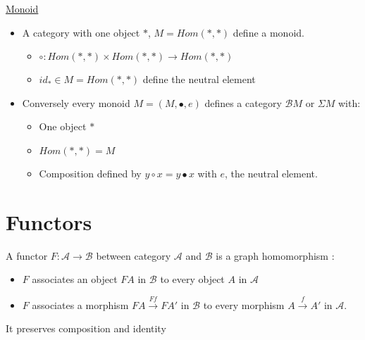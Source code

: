 \documentclass{article}
\theoremstyle{plain}
\begin{document}
    \ex \underline{Monoid}
    \begin{itemize}
      \item A category with one object $*$, $M = Hom(*, *)$ define a monoid.
        \begin{itemize}
          \item $\circ : Hom(*, *) \times Hom(*,*) \to Hom(*, *)$
          \item $id_* \in M = Hom(*, *)$ define the neutral element
        \end{itemize}
      \item Conversely every monoid $M = (M, \bullet, e)$ defines a category
        $\mathcal B M$ or $\Sigma M$ with:
        \begin{itemize}
          \item One object $*$
          \item $Hom(*, *) = M$
          \item Composition defined by $y \circ x = y \bullet x$ with $e$, the neutral
        element.

        \end{itemize}

      \begin{center}
      \end{center}
    \end{itemize}

  \section{Functors}

    A functor $F : \mathcal A \to \mathcal B$ between category $\mathcal A$ and
    $\mathcal B$ is a graph homomorphism :
    \begin{itemize}
      \item $F$ associates an object $FA$ in $\mathcal B$ to every object $A$
        in $\mathcal A$
      \item $F$ associates a morphism $FA \xrightarrow{Ff} F A'$ in $\mathcal
        B$ to every morphism $A \xrightarrow{f} A'$ in $\mathcal A$.
    \end{itemize}
    It preserves composition and identity
\end{document}
